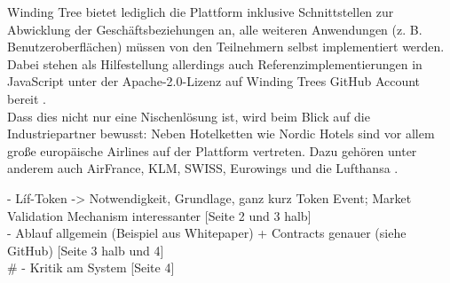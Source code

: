 Winding Tree bietet lediglich die Plattform inklusive Schnittstellen zur Abwicklung der Geschäftsbeziehungen an, alle weiteren Anwendungen (z. B. Benutzeroberflächen) müssen von den Teilnehmern selbst implementiert werden. Dabei stehen als Hilfestellung allerdings auch Referenzimplementierungen in JavaScript unter der Apache-2.0-Lizenz auf Winding Trees GitHub Account bereit \cite{WTGitHub2019}.\\
Dass dies nicht nur eine Nischenlösung ist, wird beim Blick auf die Industriepartner bewusst: Neben Hotelketten wie Nordic Hotels sind vor allem große europäische Airlines auf der Plattform vertreten. Dazu gehören unter anderem auch AirFrance, KLM, SWISS, Eurowings und die Lufthansa \cite{WTWebsite2019}.

- Líf-Token -> Notwendigkeit, Grundlage, ganz kurz Token Event; Market Validation Mechanism interessanter [Seite 2 und 3 halb]\\
- Ablauf allgemein (Beispiel aus Whitepaper) + Contracts genauer (siehe GitHub) [Seite 3 halb und 4]\\#
- Kritik am System [Seite 4] \\